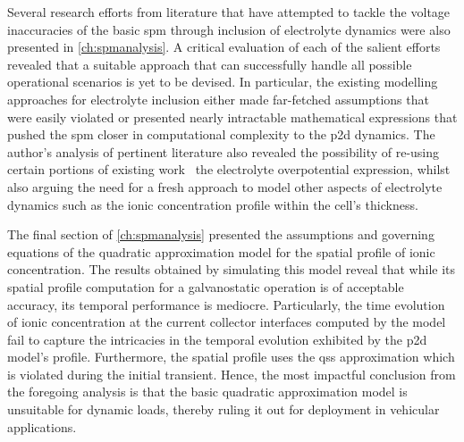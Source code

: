 
Several  research efforts  from literature  that  have attempted  to tackle  the
voltage inaccuracies  of the  basic \gls{spm}  through inclusion  of electrolyte
dynamics were also presented in  \cref{ch:spmanalysis}. A critical evaluation of
each  of  the  salient  efforts  revealed that  a  suitable  approach  that  can
successfully handle all possible operational scenarios  is yet to be devised. In
particular, the  existing modelling approaches for  electrolyte inclusion either
made  far-fetched assumptions  that  were easily  violated  or presented  nearly
intractable  mathematical  expressions  that  pushed  the  \gls{spm}  closer  in
computational complexity  to the  \gls{p2d} dynamics.  The author's analysis  of
pertinent literature  also  revealed  the  possibility of  re-using  certain
portions  of existing work \eg~the electrolyte  overpotential expression, whilst
also arguing the need  for a fresh  approach to model  other aspects of
electrolyte dynamics such as the ionic concentration profile within the cell's
thickness.

The  final  section  of  \cref{ch:spmanalysis}  presented  the  assumptions  and
governing equations of the quadratic approximation model for the spatial profile
of  ionic concentration. The  results obtained by simulating  this model reveal
that while its spatial  profile computation for a galvanostatic operation is of 
acceptable accuracy, its temporal  performance is mediocre. Particularly, the
time evolution of ionic concentration at the current collector interfaces
computed by the model fail to capture the intricacies in the temporal evolution
exhibited by  the \gls{p2d} model's profile.  Furthermore, the spatial profile
uses  the \gls{qss} approximation  which is violated during  the initial
transient. Hence, the  most impactful conclusion from the  foregoing analysis is
that the  basic quadratic approximation  model is unsuitable for  dynamic loads,
thereby ruling it out for deployment in vehicular applications.

